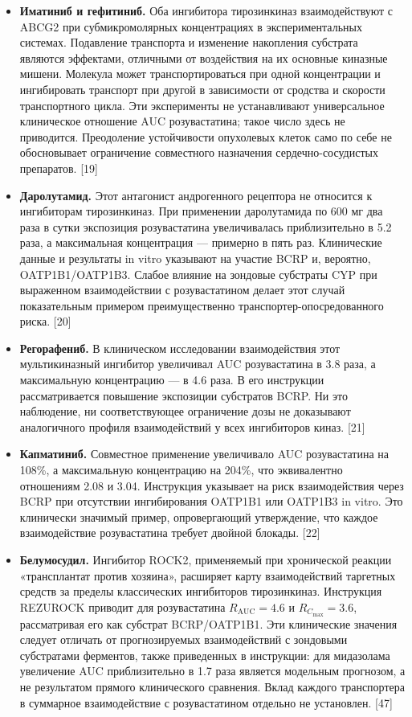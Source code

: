 \documentclass[11pt]{article}
\begin{document}
\begin{itemize}
\item \textbf{Иматиниб и гефитиниб.} Оба ингибитора тирозинкиназ взаимодействуют с ABCG2 при субмикромолярных концентрациях в экспериментальных системах. Подавление транспорта и изменение накопления субстрата являются эффектами, отличными от воздействия на их основные киназные мишени. Молекула может транспортироваться при одной концентрации и ингибировать транспорт при другой в зависимости от сродства и скорости транспортного цикла. Эти эксперименты не устанавливают универсальное клиническое отношение AUC розувастатина; такое число здесь не приводится. Преодоление устойчивости опухолевых клеток само по себе не обосновывает ограничение совместного назначения сердечно-сосудистых препаратов. [19]
\item \textbf{Даролутамид.} Этот антагонист андрогенного рецептора не относится к ингибиторам тирозинкиназ. При применении даролутамида по 600 мг два раза в сутки экспозиция розувастатина увеличивалась приблизительно в 5.2 раза, а максимальная концентрация --- примерно в пять раз. Клинические данные и результаты in vitro указывают на участие BCRP и, вероятно, OATP1B1/OATP1B3. Слабое влияние на зондовые субстраты CYP при выраженном взаимодействии с розувастатином делает этот случай показательным примером преимущественно транспортер-опосредованного риска. [20]
\item \textbf{Регорафениб.} В клиническом исследовании взаимодействия этот мультикиназный ингибитор увеличивал AUC розувастатина в 3.8 раза, а максимальную концентрацию --- в 4.6 раза. В его инструкции рассматривается повышение экспозиции субстратов BCRP. Ни это наблюдение, ни соответствующее ограничение дозы не доказывают аналогичного профиля взаимодействий у всех ингибиторов киназ. [21]
\item \textbf{Капматиниб.} Совместное применение увеличивало AUC розувастатина на 108\%, а максимальную концентрацию на 204\%, что эквивалентно отношениям 2.08 и 3.04. Инструкция указывает на риск взаимодействия через BCRP при отсутствии ингибирования OATP1B1 или OATP1B3 in vitro. Это клинически значимый пример, опровергающий утверждение, что каждое взаимодействие розувастатина требует двойной блокады. [22]
\item \textbf{Белумосудил.} Ингибитор ROCK2, применяемый при хронической реакции «трансплантат против хозяина», расширяет карту взаимодействий таргетных средств за пределы классических ингибиторов тирозинкиназ. Инструкция REZUROCK приводит для розувастатина \(R_{\mathrm{AUC}}=4.6\) и \(R_{C_{\max}}=3.6\), рассматривая его как субстрат BCRP/OATP1B1. Эти клинические значения следует отличать от прогнозируемых взаимодействий с зондовыми субстратами ферментов, также приведенных в инструкции: для мидазолама увеличение AUC приблизительно в 1.7 раза является модельным прогнозом, а не результатом прямого клинического сравнения. Вклад каждого транспортера в суммарное взаимодействие с розувастатином отдельно не установлен. [47]

\end{itemize}
\end{document}
